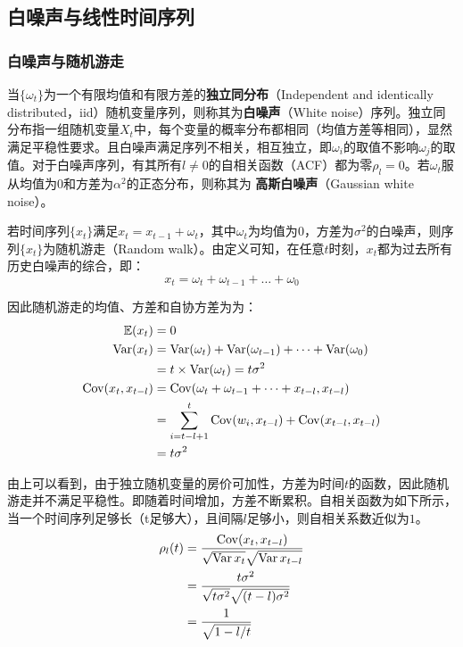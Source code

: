 \documentclass[11pt]{article}
\begin{document}
\subsection{白噪声与线性时间序列}

\subsubsection{白噪声与随机游走}

当$\{\omega_t\}$为一个有限均值和有限方差的\textbf{独立同分布}（Independent and identically distributed，iid）随机变量序列，则称其为\textbf{白噪声}（White noise）序列。独立同分布指一组随机变量$X_t$中，每个变量的概率分布都相同（均值方差等相同），显然满足平稳性要求。且白噪声满足序列不相关，相互独立，即$\omega_i$的取值不影响$\omega_j$的取值。对于白噪声序列，有其所有$l \neq 0 $的自相关函数（ACF）都为零$\rho_l = 0$。若$\omega_t$服从均值为$0$和方差为$\alpha^{2}$的正态分布，则称其为\textbf{
高斯白噪声}（Gaussian white noise）。

若时间序列$\{x_t\}$满足$x_t = x_{t-1} + \omega_t$，其中$\omega_t$为均值为$0$，方差为$\sigma^2$的白噪声，则序列$\{x_t\}$为随机游走（Random walk）。由定义可知，在任意$t$时刻，$x_t$都为过去所有历史白噪声的综合，即：
\begin{equation*}
    x_t = \omega_{t} + \omega_{t-1} + \dots + \omega_0
\end{equation*}

因此随机游走的均值、方差和自协方差为为：
\begin{align*}
    \mathbb{E}(x_t) &= 0 \\
    \operatorname{Var}(x_t) &= \operatorname{Var}(\omega_{t}) + \operatorname{Var}(\omega_{t-1}) + \dots + \operatorname{Var}(\omega_{0}) \\
    &= t \times \operatorname{Var}(\omega_t) = t \sigma^2 \\
    \operatorname{Cov}(x_t,x_{t-l}) &= \operatorname{Cov}(\omega_{t}+ \omega_{t-1} + \dots + x_{t-l},x_{t-l}) \\
    &= \sum_{i=t-l+1}^{t} \operatorname{Cov}(w_i,x_{t-l}) + \operatorname{Cov}(x_{t-l},x_{t-l}) \\
    &= t\sigma^2
\end{align*}

由上可以看到，由于独立随机变量的房价可加性，方差为时间$t$的函数，因此随机游走并不满足平稳性。即随着时间增加，方差不断累积。自相关函数为如下所示，当一个时间序列足够长（t足够大），且间隔$l$足够小，则自相关系数近似为$1$。
\begin{align*}
    \rho_l(t) &= \frac{\operatorname{Cov}(x_{t},x_{t-l})}{\sqrt{\operatorname{Var}{x_{t}}}\sqrt{\operatorname{Var}{x_{t-l}}}} \\
    &= \frac{t\sigma^2}{\sqrt{t\sigma^2}\sqrt{(t-l)\sigma^2}} \\
    &= \frac{1}{\sqrt{1-l/t}}
\end{align*}
\end{document}
